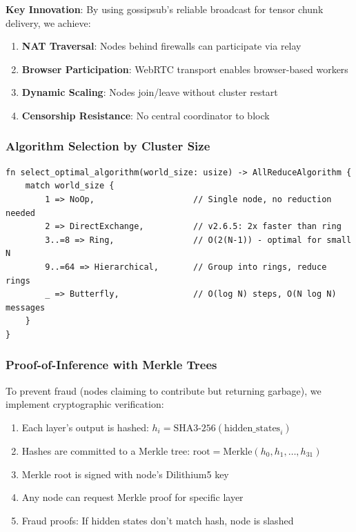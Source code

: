 \documentclass[11pt,a4paper]{article}
\begin{document}
\textbf{Key Innovation}: By using gossipsub's reliable broadcast for tensor chunk delivery, we achieve:
\begin{enumerate}[noitemsep]
    \item \textbf{NAT Traversal}: Nodes behind firewalls can participate via relay
    \item \textbf{Browser Participation}: WebRTC transport enables browser-based workers
    \item \textbf{Dynamic Scaling}: Nodes join/leave without cluster restart
    \item \textbf{Censorship Resistance}: No central coordinator to block
\end{enumerate}

\subsubsection{Algorithm Selection by Cluster Size}

\begin{lstlisting}[caption={Adaptive All-Reduce Algorithm Selection}]
fn select_optimal_algorithm(world_size: usize) -> AllReduceAlgorithm {
    match world_size {
        1 => NoOp,                    // Single node, no reduction needed
        2 => DirectExchange,          // v2.6.5: 2x faster than ring
        3..=8 => Ring,                // O(2(N-1)) - optimal for small N
        9..=64 => Hierarchical,       // Group into rings, reduce rings
        _ => Butterfly,               // O(log N) steps, O(N log N) messages
    }
}
\end{lstlisting}

\subsubsection{Proof-of-Inference with Merkle Trees}

To prevent fraud (nodes claiming to contribute but returning garbage), we implement cryptographic verification:

\begin{enumerate}[noitemsep]
    \item Each layer's output is hashed: $h_i = \text{SHA3-256}(\text{hidden\_states}_i)$
    \item Hashes are committed to a Merkle tree: $\text{root} = \text{Merkle}(h_0, h_1, \ldots, h_{31})$
    \item Merkle root is signed with node's Dilithium5 key
    \item Any node can request Merkle proof for specific layer
    \item Fraud proofs: If hidden states don't match hash, node is slashed
\end{enumerate}
\end{document}
